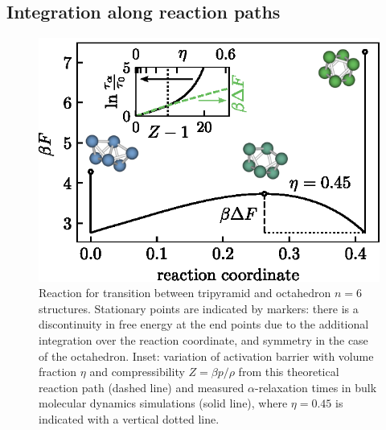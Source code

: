 \documentclass[11pt,twoside]{report}
\begin{document}
\subsection{Integration along reaction paths}


\begin{figure}
  \includegraphics[width=0.9\linewidth,outer]{n6-reaction-path}
  \caption[The simplest nontrivial reaction path in hard spheres: octahedron to tripyramid]{
    Reaction for transition between tripyramid and octahedron $n = 6$ structures.
    Stationary points are indicated by markers: there is a discontinuity in free energy at the end points due to the additional integration over the reaction coordinate, and symmetry in the case of the octahedron.
    Inset: variation of activation barrier with volume fraction $\eta$ and compressibility $Z = \beta p/\rho$ from this theoretical reaction path (dashed line) and measured $\alpha$-relaxation times in bulk molecular dynamics simulations (solid line), where $\eta = 0.45$ is indicated with a vertical dotted line.
  }
  \label{fig:reaction-path-6}
\end{figure}
\end{document}
